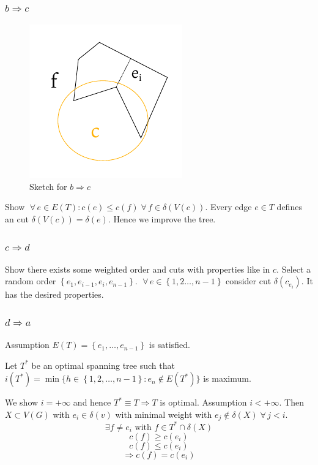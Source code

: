 \documentclass{article}
\newcommand{\set}[1]{\left\{#1\right\}}
\newcommand{\fall}{\;\forall\,}
\begin{document}
\subsubsection{$b \Rightarrow c$}
%
\begin{figure}[t]
  \begin{center}
    \includegraphics{img/bc.pdf}
    \caption{Sketch for $b \Rightarrow c$}
  \end{center}
\end{figure}

Show $\fall e \in E(T): c(e) \leq c(f) \fall f \in \delta(V(c))$. Every edge $e \in T$ defines an cut $\delta(V(c)) = \delta(e)$. Hence we improve the tree.

\subsubsection{$c \Rightarrow d$}
%
Show there exists some weighted order and cuts with properties like in $c$. Select a random order $\set{e_1, e_{i-1}, e_i, e_{n-1}}$. $\fall e \in \set{1, 2 \ldots, n-1}$ consider cut $\delta(c_{e_i})$. It has the desired properties.

\subsubsection{$d \Rightarrow a$}
%
Assumption $E(T) = \set{e_1, \ldots, e_{n-1}}$ is satisfied.

Let $T^*$ be an optimal spanning tree such that $i(T^*) = \min\{h \in \set{1, 2, \ldots, n-1}: e_n \notin E(T^*)\}$ is maximum.

We show $i = +\infty$ and hence $T^* \equiv T \Rightarrow T$ is optimal.
Assumption $i < +\infty$. Then $X \subset V(G)$ with $e_i \in \delta(v)$ with minimal weight with $e_j \notin \delta(X) \fall j < i$.
\[
  \exists f \neq e_i \text{ with } f \in T^* \cap \delta(X)
\] \[
  c(f) \geq c(e_i)
\] \[
  c(f) \leq c(e_i)
\] \[
  \Rightarrow c(f) = c(e_i)
\]
\end{document}
